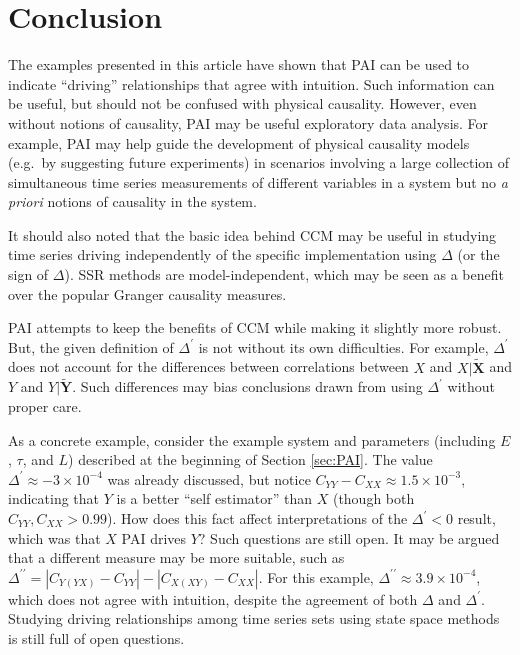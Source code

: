 \documentclass[twocolumn,aps,pre,groupedaddress]{revtex4-1}
\begin{document}
\section{Conclusion}
The examples presented in this article have shown that PAI can be used to indicate ``driving'' relationships that agree with intuition.  Such information can be useful, but should not be confused with physical causality.  However, even without notions of causality, PAI may be useful exploratory data analysis.  For example, PAI may help guide the development of physical causality models (e.g.\ by suggesting future experiments) in scenarios involving a large collection of simultaneous time series measurements of different variables in a system but no {\em a priori} notions of causality in the system.

It should also noted that the basic idea behind CCM may be useful in studying time series driving independently of the specific implementation using $\Delta$ (or the sign of $\Delta$). SSR methods are model-independent, which may be seen as a benefit over the popular Granger causality measures.  

PAI attempts to keep the benefits of CCM while making it slightly more robust.  But, the given definition of $\Delta^\prime$ is not without its own difficulties.  For example, $\Delta^\prime$ does not account for the differences between correlations between $X$ and $X|\tilde{\mathbf{X}}$ and $Y$ and $Y|\tilde{\mathbf{Y}}$.  Such differences may bias conclusions drawn from using $\Delta^\prime$ without proper care.  

As a concrete example, consider the example system and parameters (including $E$, $\tau$, and $L$) described at the beginning of Section \ref{sec:PAI}.  The value $\Delta^\prime \approx -3\times 10^{-4}$ was already discussed, but notice $C_{YY}-C_{XX} \approx 1.5\times10^{-3}$, indicating that $Y$ is a better ``self estimator'' than $X$ (though both $C_{YY},C_{XX}>0.99$).  How does this fact affect interpretations of the $\Delta^\prime<0$ result, which was that $X$ PAI drives $Y$?  Such questions are still open.  It may be argued that a different measure may be more suitable, such as $\Delta^{\prime\prime} = |C_{Y(YX)}-C_{YY}|-|C_{X(XY)}-C_{XX}|$.  For this example, $\Delta^{\prime\prime} \approx 3.9\times 10^{-4}$, which does not agree with intuition, despite the agreement of both $\Delta$ and $\Delta^\prime$.  Studying driving relationships among time series sets using state space methods is still full of open questions.
\end{document}

